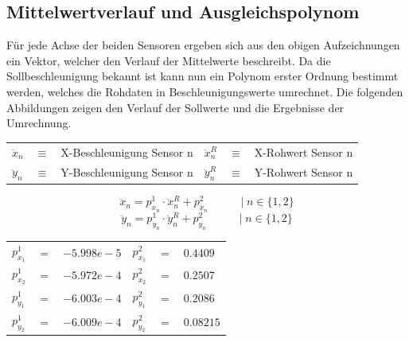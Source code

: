\newpage
\subsection{Mittelwertverlauf und Ausgleichspolynom}
Für jede Achse der beiden Sensoren ergeben sich aus den obigen Aufzeichnungen ein Vektor, welcher den Verlauf der Mittelwerte beschreibt. Da die Sollbeschleunigung bekannt ist kann nun ein Polynom erster Ordnung bestimmt werden, welches die Rohdaten in Beschleunigungswerte umrechnet. Die folgenden Abbildungen zeigen den Verlauf der Sollwerte und die Ergebnisse der Umrechnung.


\begin{table}[h]
\centering
\begin{tabular}{lcllcl}
$\ddot{x}_n$ &$\equiv$& X-Beschleunigung Sensor n &
$\ddot{x}^R_n$ &$\equiv$& X-Rohwert Sensor n \\
$\ddot{y}_n$ &$\equiv$& Y-Beschleunigung Sensor n &
$\ddot{y}^R_n$ &$\equiv$& Y-Rohwert Sensor n
\end{tabular}
\end{table}

\vspace*{-\baselineskip}
\begin{equation}
\ddot{x}_n = p^1_{x_n} \cdot \ddot{x}^R_n + p^2_{x_n} \hspace{35pt} \vert \hspace{3pt} n \in \{1, 2\}
\end{equation}
\begin{equation}
\ddot{y}_n = p^1_{y_n} \cdot \ddot{y}^R_n + p^2_{y_n} \hspace{35pt} \vert \hspace{3pt} n \in \{1, 2\}
\end{equation}
\vspace*{-\baselineskip}
\begin{table}[h]
\centering
\begin{tabular}{lcllcl}
$p^1_{x_1}$ &$=$& $-5.998e-5$ & $p^2_{x_1}$ &$=$& $0.4409$ \\
$p^1_{x_2}$ &$=$& $-5.972e-4$ & $p^2_{x_2}$ &$=$& $0.2507$ \\
$p^1_{y_1}$ &$=$& $-6.003e-4$ & $p^2_{y_1}$ &$=$& $0.2086$ \\
$p^1_{y_2}$ &$=$& $-6.009e-4$ & $p^2_{y_2}$ &$=$& $0.08215$ \\
\end{tabular}
\end{table}


